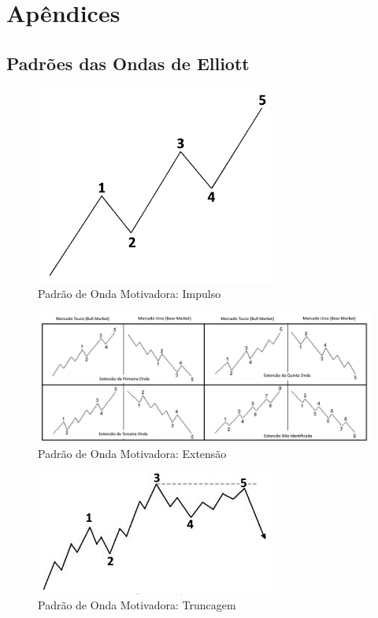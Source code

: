 \documentclass[12pt]{article}
\begin{document}
\section*{Apêndices}
\renewcommand{\thesubsection}{\Alph{subsection}}

\subsection{Padrões das Ondas de Elliott} \label{app:EWPatterns}

\begin{figure}[H]
	\centering
	\includegraphics[width=0.7\textwidth]{EW_pattern_01.png}
	\caption{Padrão de Onda Motivadora: Impulso}\label{fig:EW_pattern_01}
\end{figure}

\begin{figure}[H]
	\centering
	\includegraphics[width=\textwidth]{EW_pattern_02.png}
	\caption{Padrão de Onda Motivadora: Extensão}\label{fig:EW_pattern_02}
\end{figure}

\begin{figure}[H]
	\centering
	\includegraphics[width=0.7\textwidth]{EW_pattern_03.png}
	\caption{Padrão de Onda Motivadora: Truncagem}\label{fig:EW_pattern_03}
\end{figure}
\end{document}
